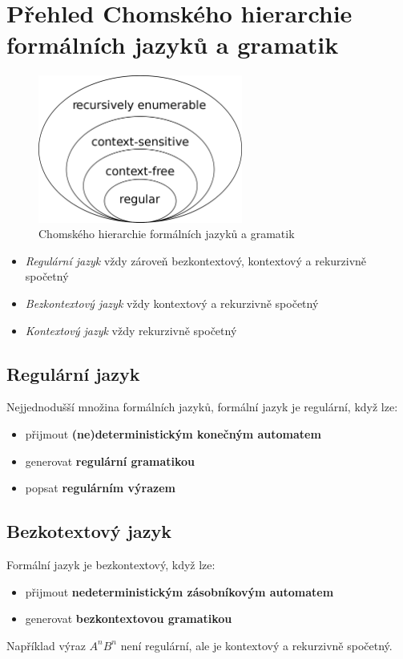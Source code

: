 \documentclass{szzclass}
\author{Jakub Rathouský}
\begin{document}
\tableofcontents
\newpage

\section{Přehled Chomského hierarchie formálních ja\-zyků a gramatik}

\begin{figure}[ht]
    \centering
    \includegraphics[width=0.6\textwidth]{topics/bi-spol-01/images/Chomsky_hierarchy.png}
    \caption{Chomského hierarchie formálních jazyků a gramatik}
\end{figure}

\begin{itemize}
\item\textit{Regulární jazyk}
vždy zároveň bezkontextový, kontextový a rekurzivně spočetný
\item\textit{Bezkontextový jazyk}
vždy kontextový a rekurzivně spočetný
\item\textit{Kontextový jazyk}
vždy rekurzivně spočetný
\end{itemize}

\subsection{Regulární jazyk}
Nejjednodušší množina formálních jazyků, formální jazyk je regulární, když lze:
\begin{itemize}
\item přijmout \textbf{(ne)deterministickým konečným automatem}
\item generovat \textbf{regulární gramatikou}
\item popsat \textbf{regulárním výrazem}
\end{itemize}

\subsection{Bezkotextový jazyk}
Formální jazyk je bezkontextový, když lze:
\begin{itemize}
\item přijmout \textbf{nedeterministickým zásobníkovým automatem}
\item generovat \textbf{bezkontextovou gramatikou}
\end{itemize}
Například výraz $A^nB^n$ není regulární, ale je kontextový a rekurzivně spočetný.
\end{document}
